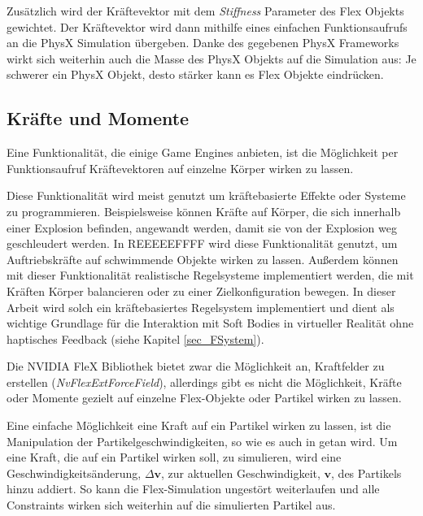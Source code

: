 Zusätzlich wird der Kräftevektor mit dem \textit{Stiffness} Parameter des Flex Objekts gewichtet.
Der Kräftevektor wird dann mithilfe eines einfachen Funktionsaufrufs an die PhysX Simulation übergeben. Danke des gegebenen PhysX Frameworks wirkt sich weiterhin auch die Masse des PhysX Objekts auf die Simulation aus: Je schwerer ein PhysX Objekt, desto stärker kann es Flex Objekte eindrücken.

\subsection{Kräfte und Momente}

Eine Funktionalität, die einige Game Engines anbieten, ist die Möglichkeit per Funktionsaufruf Kräftevektoren auf einzelne Körper wirken zu lassen. 

Diese Funktionalität wird meist genutzt um kräftebasierte Effekte oder Systeme zu programmieren. Beispielsweise können Kräfte auf Körper, die sich innerhalb einer Explosion befinden, angewandt werden, damit sie von der Explosion weg geschleudert werden. In REEEEEFFFF wird diese Funktionalität genutzt, um Auftriebskräfte auf schwimmende Objekte wirken zu lassen. 
Außerdem können mit dieser Funktionalität realistische Regelsysteme implementiert werden, die mit Kräften Körper balancieren oder zu einer Zielkonfiguration bewegen. In dieser Arbeit wird solch ein kräftebasiertes Regelsystem implementiert und dient als wichtige Grundlage für die Interaktion mit Soft Bodies in virtueller Realität ohne haptisches Feedback (siehe Kapitel \ref{sec_FSystem}).


Die NVIDIA FleX Bibliothek bietet zwar die Möglichkeit an, Kraftfelder zu erstellen (\textit{NvFlexExtForceField}), allerdings gibt es nicht die Möglichkeit, Kräfte oder Momente gezielt auf einzelne Flex-Objekte oder Partikel wirken zu lassen. %

Eine einfache Möglichkeit eine Kraft auf ein Partikel wirken zu lassen, ist die Manipulation der Partikelgeschwindigkeiten, so wie es auch in \cite{PBD} getan wird. Um eine Kraft, die auf ein Partikel wirken soll, zu simulieren, wird eine Geschwindigkeitsänderung, $\Delta\textbf{v}$, zur aktuellen Geschwindigkeit, $\textbf{v}$, des Partikels hinzu addiert. So kann die Flex-Simulation ungestört weiterlaufen und alle Constraints
wirken sich weiterhin auf die simulierten Partikel aus.

